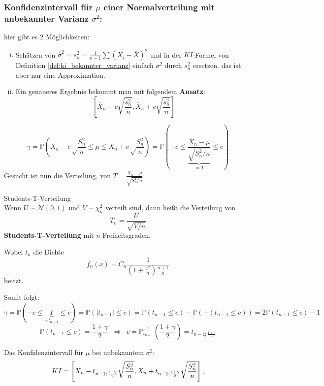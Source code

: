\subsubsection{Konfidenzintervall für $\mu$ einer Normalverteilung mit unbekannter Varianz $\sigma^2$:}\label{sec:ki_mu_unbekanntes_sigma}
hier gibt es 2 Möglichkeiten:
\begin{enumerate}[i)]
    \item Schätzen von $\hat\sigma^2=s_n^2=\frac{1}{n-1}\sum(X_i-\overline X)^2$
    und in der $KI$-Formel von Definition \ref{def:ki_bekannter_varianz} einfach $\sigma^2$ durch $s_n^2$ ersetzen.
    das ist aber nur eine Approximation.
    \item Ein genaueres Ergebnis bekommt man mit folgendem \textbf{Ansatz}:
        \[\left[\overline X_n-c\sqrt{\frac{s_n^2}{n}}, \overline X_n+c\sqrt{\frac{s_n^2}{n}}\right]\]
\end{enumerate}
\[\gamma=\mathbb{P}\left(\overline X_n-c\sqrt\frac{S_n^2}{n}\leq \mu\leq \overline X_n+c\sqrt\frac{S_n^2}{n}\right)=
\mathbb{P}\left(-c\leq\underbrace{\frac{\overline X_n-\mu}{\sqrt{S_n^2/n}}}_{=T}\leq c\right)\]
Gesucht ist nun die Verteilung, von $T=\frac{\overline X_n-\mu}{\sqrt{S_n^2/n}}$

\ifdefined\uebsps

\fi
\begin{definition} Students-T-Verteilung\\
Wenn $U\sim\mathcal{N}(0,1)$ und $V\sim\chi_n^2$ verteilt sind, dann heißt die Verteilung von 
\[T_n=\frac{U}{\sqrt{V/n}}\] 
\textbf{Students-T-Verteilung} mit $n$-Freiheitsgraden.

Wobei $t_n$ die Dichte
\[f_n(x)=C_n\frac{1}{\left(1+\frac{x^2}{n}\right)\frac{n+1}{n}}\]
beitzt.
\end{definition}

Somit folgt:
\[\gamma=\mathbb{P}(-c\leq \underbrace{T}_{\sim t_{n-1}}\leq c)=
\mathbb{P}(|t_{n-1}|\leq c)=\mathbb{P}(t_{n-1}\leq c)-\mathbb{P}(-(t_{n-1}\leq c))=2\mathbb{P}(t_{n-1}\leq c)-1\]
\[\mathbb{P}(t_{n-1}\leq c)=\frac{1+\gamma}{2}\;\;\Rightarrow\;\;c=\mathbb{P}^{-1}_{t_{n-1}}(\frac{1+\gamma}{2})=t_{n-1;\frac{1+\gamma}{2}}\]
\begin{definition}
\label{def:ki_unbekannter_varianz}
Das Konfidenzintervall für $\mu$ bei unbekanntem $\sigma^2$:
\[KI=\left[\bar X_n-t_{n-1;{1+\gamma\over 2}}\sqrt{S_n^2\over n},
\bar X_n+t_{n-1;{1+\gamma\over 2}}\sqrt{S_n^2\over n}\right],\]
\end{definition}

